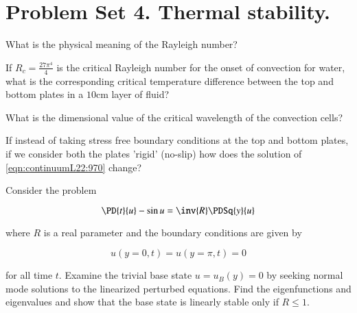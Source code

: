 \chapter{Problem Set 4.  Thermal stability.}
\label{chap:continuumProblemSet4}

\begin{Exercise}
What is the physical meaning of the Rayleigh number?
\end{Exercise}
\begin{Exercise}
If $R_c = \frac{27 \pi^4}{4}$ is the critical Rayleigh number for the onset of convection for water, what is the corresponding critical temperature difference between the top and bottom plates in a $10 \text{cm}$ layer of fluid?
\end{Exercise}
\begin{Exercise}
What is the dimensional value of the critical wavelength of the convection cells?
\end{Exercise}
\begin{Exercise}
If instead of taking stress free boundary conditions at the top and bottom plates, if we consider both the plates 'rigid' (no-slip) how does the solution of \ref{eqn:continuumL22:970} change?
\end{Exercise}
\begin{Exercise}
Consider the problem

\begin{equation}\label{eqn:problemSet4:10}
\PD{t}{u} - \sin u = \inv{R} \PDSq{y}{u}
\end{equation}

where $R$ is a real parameter and the boundary conditions are given by

\begin{equation}\label{eqn:problemSet4:20}
u(y = 0, t) = u(y = \pi, t) = 0
\end{equation}

for all time $t$. Examine the trivial base state $u = u_B(y) = 0$ by seeking normal mode solutions to the linearized perturbed equations. Find the eigenfunctions and eigenvalues and show that the base state is linearly stable only if $R \le 1$.
\end{Exercise}
